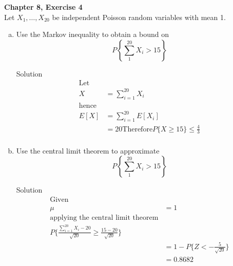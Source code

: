 \documentclass{article}
\begin{document}
\begin{spacing}{1.1}
\newpage
\begin{homeworkProblem}
  {\bf Chapter 8, Exercise 4}\\
  Let $X_1, \dots, X_{20}$ be independent Poisson random variables 
  with mean 1.
  \begin{enumerate}[(a)]
    \item Use the Markov inequality to obtain a bound on
      \[P\left\{ \sum\limits_1^{20} X_i > 15 \right\}\]
      \begin{homeworkSection}{Solution}
        \begin{align*}
          \text{Let}\\
          X &= \sum\limits_{i = 1}^{20} X_i\\
          \text{hence}\\
          E[X] &= \sum\limits_{i = 1}^{20} E[ X_i]\\ 
          &= 20
          \text{Therefore}
          P\{ X \ge 15\} \le \frac{ 4}{ 3}\\
        \end{align*}
      \end{homeworkSection}
    \item Use the central limit theorem to approximate
      \[P\left\{ \sum\limits_1^{20} X_i > 15 \right\}\]
      \begin{homeworkSection}{Solution}
        \begin{align*}
          \text{Given}\\
          \mu &= 1\\
          \text{applying the central limit theorem}\\
          P\{ \frac{ \sum\limits_{i = 1}^{20} X_i - 20}{ \sqrt{ 20}} \ge \frac{ 15 - 20}{ \sqrt{20}}\}\\
          &= 1 - P\{ Z < -\frac{ 5}{ \sqrt{ 20}}\}\\
          &= 0.8682
        \end{align*}
      \end{homeworkSection}
  \end{enumerate}
\end{homeworkProblem}


\end{spacing}
\end{document}

